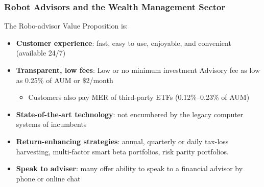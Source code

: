 \documentclass[aspectratio=169]{beamer}
\begin{document}
\begin{frame}
\frametitle{Robot Advisors and the Wealth Management Sector}


\vspace{-2mm}
The Robo-advisor Value Proposition is:  
\begin{itemize}
    \item \textbf{Customer experience}: fast, easy to use, enjoyable, and convenient (available 24/7)
    \smallskip 

    \item \textbf{Transparent, low fees}: Low or no minimum investment Advisory fee as low as 0.25\% of AUM or \$2/month
    \begin{itemize}
        \item Customers also pay MER of third-party ETFs (0.12\%–0.23\% of AUM)
    \end{itemize}
    \smallskip 

    \item \textbf{State-of-the-art technology}: not encumbered by the legacy computer systems of incumbents
    \smallskip 
    
    \item \textbf{Return-enhancing strategies}: annual, quarterly or daily tax-loss harvesting, multi-factor smart beta portfolios, risk parity portfolios. 

    \smallskip 

    \item \textbf{Speak to adviser}: many offer ability to speak to a financial advisor by phone or online chat
    
\end{itemize}




\end{frame} 
\end{document}
